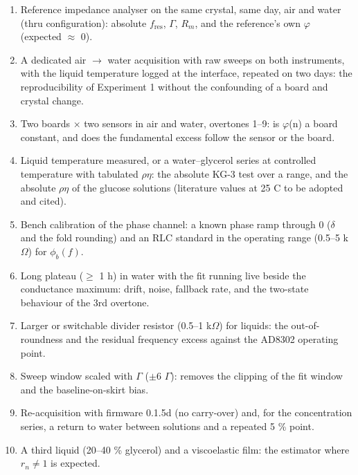 \documentclass[11pt,a4paper]{article}
\begin{document}
\begin{enumerate}
\item Reference impedance analyser on the same crystal, same day, air and water (thru configuration): absolute $f_\mathrm{res}$, $\Gamma$, $R_m$, and the reference's own $\varphi$ (expected $\approx$ 0).
\item A dedicated air $\rightarrow$ water acquisition with raw sweeps on both instruments, with the liquid temperature logged at the interface, repeated on two days: the reproducibility of Experiment 1 without the confounding of a board and crystal change.
\item Two boards $\times$ two sensors in air and water, overtones 1--9: is $\varphi$(n) a board constant, and does the fundamental excess follow the sensor or the board.
\item Liquid temperature measured, or a water--glycerol series at controlled temperature with tabulated $\rho$$\eta$: the absolute KG-3 test over a range, and the absolute $\rho$$\eta$ of the glucose solutions (literature values at 25 \textdegree{}C to be adopted and cited).
\item Bench calibration of the phase channel: a known phase ramp through 0\textdegree{} ($\delta$ and the fold rounding) and an RLC standard in the operating range (0.5--5 k$\Omega$) for $\phi_b(f)$.
\item Long plateau ($\ge$ 1 h) in water with the fit running live beside the conductance maximum: drift, noise, fallback rate, and the two-state behaviour of the 3rd overtone.
\item Larger or switchable divider resistor (0.5--1 k$\Omega$) for liquids: the out-of-roundness and the residual frequency excess against the AD8302 operating point.
\item Sweep window scaled with $\Gamma$ ($\pm$6 $\Gamma$): removes the clipping of the fit window and the baseline-on-skirt bias.
\item Re-acquisition with firmware 0.1.5d (no carry-over) and, for the concentration series, a return to water between solutions and a repeated 5 \% point.
\item A third liquid (20--40 \% glycerol) and a viscoelastic film: the estimator where $r_n \ne 1$ is expected.
\end{enumerate}



\end{document}
